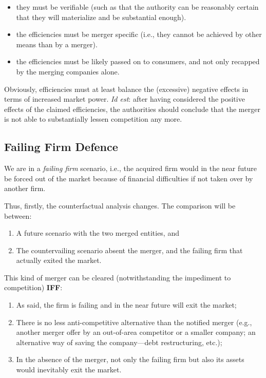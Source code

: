         \begin{itemize}
            \item they must be verifiable (such as that the authority can be reasonably certain that they will materialize and be substantial enough).
            
            \item the efficiencies must be merger specific (i.e., they cannot be achieved by other means than by a merger).
            
            \item the efficiencies must be likely passed on to consumers, and not only recapped by the merging companies alone.
        \end{itemize}
        
        Obviously, efficiencies must at least balance the (excessive) negative effects in terms of increased market power. \textit{Id est}: after having considered the positive effects of the claimed efficiencies, the authorities should conclude that the merger is not able to substantially lessen competition any more.

    \subsection{Failing Firm Defence}\label{FFD}

        We are in a \textit{failing firm} scenario, i.e., the acquired firm would in the near future be forced out of the market because of financial difficulties if not taken over by another firm.
        
        Thus, firstly, the counterfactual analysis changes. The comparison will be between:
        \begin{enumerate}
            \item A future scenario with the two merged entities, and
            \item The countervailing scenario absent the merger, and the failing firm that actually exited the market.
        \end{enumerate}
        
        This kind of merger can be cleared (notwithstanding the impediment to competition) \textbf{IFF}:
        \begin{enumerate}
            \item As said, the firm is failing and in the near future will exit the market;
            \item There is no less anti-competitive alternative than the notified merger (e.g., another merger offer by an out-of-area competitor or a smaller company; an alternative way of saving the company—debt restructuring, etc.);
            \item In the absence of the merger, not only the failing firm but also its assets would inevitably exit the market.
        \end{enumerate}
        
